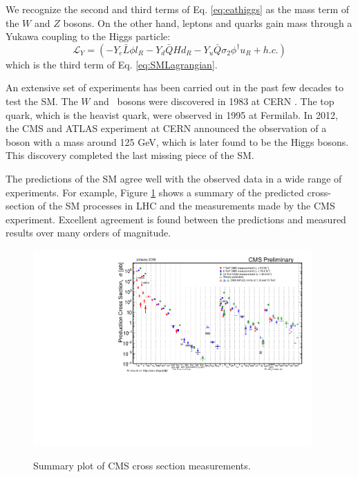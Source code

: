 \documentclass[thesis.tex]{subfiles}
\begin{document}
We recognize the second and third terms of Eq. \ref{eq:eathiggs} as the mass term of the $W$ and $Z$ bosons. On the other hand, leptons and quarks gain mass through a Yukawa coupling to the Higgs particle:
	\begin{equation}
		\mathcal{L}_Y = (- Y_e \bar{L} \phi l_R - Y_d \bar{Q}H d_R - Y_u \bar{Q} \sigma_2 \phi^\dagger u_R + h.c.)
	\end{equation}
which is the third term of Eq. \ref{eq:SMLagrangian}. 


An extensive set of experiments has been carried out in the past few decades to test the SM. 
The $W$ and \PZ~bosons were discovered in 1983 at CERN \cite{WdiscoveryUA1,WdiscoveryUA2,ZdiscoveryUA1,ZdiscoveryUA2}. The top quark, which is the heavist quark, were observed in 1995 at Fermilab. 
In 2012, the CMS and ATLAS experiment at CERN announced the observation of a boson with a mass around 125 GeV, which is later found to be the Higgs bosons.
This discovery completed the last missing piece of the SM.  

The predictions of the SM agree well with the observed data in a wide range of experiments. 
For example, Figure \ref{fig1-1} shows a summary of the predicted cross-section of the SM processes in LHC and the measurements made by the CMS experiment.
Excellent agreement is found between the predictions and measured results over many orders of magnitude.

	\begin{figure}[h]
		\centering
	\includegraphics[width=0.95\textwidth]{plot/SigmaNew_v0.pdf}
	\label{fig1-1}
	\caption{Summary plot of CMS cross section measurements.}
	\end{figure}
	
\end{document}
